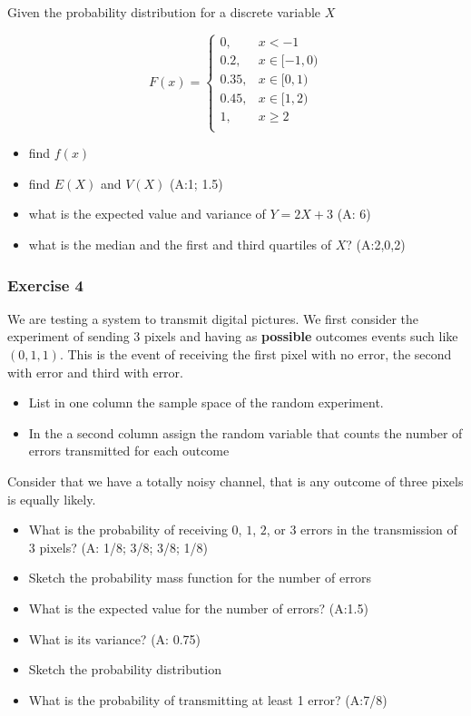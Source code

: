 \documentclass[
]{book}
\providecommand{\tightlist}{%
  \setlength{\itemsep}{0pt}\setlength{\parskip}{0pt}}
\begin{document}
Given the probability distribution for a discrete variable \(X\)

\[
    F(x)= 
\begin{cases}
0, & x < -1 \\
0.2,& x \in [-1,0)\\
0.35,& x \in [0,1)\\
0.45,& x \in [1,2)\\
1,& x \geq 2\\
\end{cases}
\]

\begin{itemize}
\tightlist
\item
  find \(f(x)\)
\item
  find \(E(X)\) and \(V(X)\) (A:1; 1.5)
\item
  what is the expected value and variance of \(Y=2X+3\) (A: 6)
\item
  what is the median and the first and third quartiles of \(X\)? (A:2,0,2)
\end{itemize}

\hypertarget{exercise-4-2}{%
\subsubsection{Exercise 4}\label{exercise-4-2}}

We are testing a system to transmit digital pictures. We first consider the experiment of sending \(3\) pixels and having as \textbf{possible} outcomes events such like \((0,1,1)\). This is the event of receiving the first pixel with no error, the second with error and third with error.

\begin{itemize}
\item
  List in one column the sample space of the random experiment.
\item
  In the a second column assign the random variable that counts the number of errors transmitted for each outcome
\end{itemize}

Consider that we have a totally noisy channel, that is any outcome of three pixels is equally likely.

\begin{itemize}
\item
  What is the probability of receiving \(0\), \(1\), \(2\), or \(3\) errors in the transmission of \(3\) pixels? (A: 1/8; 3/8; 3/8; 1/8)
\item
  Sketch the probability mass function for the number of errors
\item
  What is the expected value for the number of errors? (A:1.5)
\item
  What is its variance? (A: 0.75)
\item
  Sketch the probability distribution
\item
  What is the probability of transmitting at least 1 error? (A:7/8)
\end{itemize}
\end{document}
